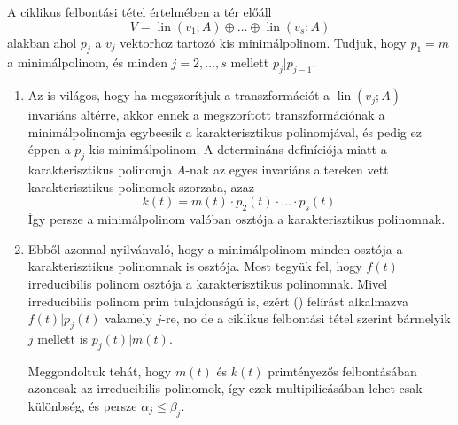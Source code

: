 \documentclass[a4paper, showtrims]{memoir}
\makeatletter
\renewenvironment{proof}[1][\proofname]
    {\par\pushQED{\qed}%
    \normalfont \topsep6\p@\@plus6\p@\relax
    \trivlist
    \item[\hskip\labelsep
        \itshape
    #1\@addpunct{:}]\ignorespaces}
    {\popQED\endtrivlist\@endpefalse}
\theoremstyle{plain}
\theoremstyle{remark}
\theoremstyle{definition}
\DeclareMathOperator{\lin}{lin}
\makeatother
\begin{document}
\begin{proof}
    A ciklikus felbontási tétel értelmében a tér előáll
    \[
        V=
        \lin\left( v_1;A \right)
        \oplus\ldots\oplus
        \lin\left( v_s;A \right)
    \]
    alakban ahol $p_j$ a $v_j$ vektorhoz tartozó kis minimálpolinom.
    Tudjuk, hogy $p_1=m$ a minimálpolinom,
    és minden $j=2,\ldots,s$ mellett $p_j|p_{j-1}$.
    \begin{enumerate}
        \item 
    Az is világos, hogy ha megszorítjuk a transzformációt a 
    $\lin\left( v_j;A \right)$ invariáns altérre, akkor ennek a megszorított transzformációnak
    a minimálpolinomja egybeesik a karakterisztikus polinomjával, és pedig ez éppen a $p_j$
    kis minimálpolinom.
    A determináns definíciója miatt a karakterisztikus polinomja $A$-nak az egyes invariáns altereken vett karakterisztikus polinomok szorzata, azaz
    \[
        k\left( t \right)
        =
        m\left( t \right)\cdot
        p_2\left( t \right)\cdot\ldots\cdot p_s\left( t \right).
        \tag{\dag}
    \]
    Így persze a minimálpolinom valóban osztója a karakterisztikus polinomnak.
    
        \item
    Ebből azonnal nyilvánvaló, 
    hogy a minimálpolinom minden osztója a karakterisztikus polinomnak is osztója.
    Most tegyük fel, hogy $f\left( t \right)$ irreducibilis polinom osztója a karakterisztikus
    polinomnak.
    Mivel irreducibilis polinom prim tulajdonságú is, 
    ezért (\dag) felírást alkalmazva $f\left( t \right)|p_j\left( t \right)$ valamely
    $j$-re, 
    no de a ciklikus felbontási tétel szerint bármelyik $j$ mellett is
    $p_j\left( t \right)|m\left( t \right)$.

    Meggondoltuk tehát, hogy $m\left( t \right)$ és $k\left( t \right)$
    primtényezős felbontásában azonosak az irreducibilis polinomok,
    így ezek multipilicásában lehet csak különbség, és persze $\alpha_j\leq\beta_j$.


\end{enumerate}
\end{proof}
\end{document}

